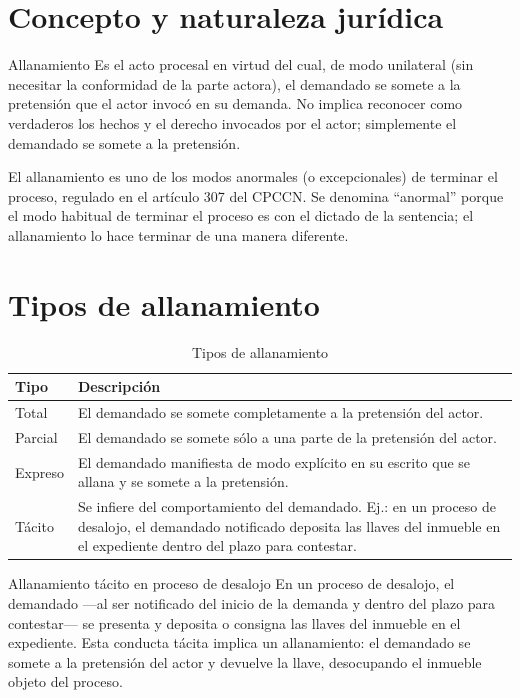 \documentclass[12pt,oneside]{book}
\begin{document}
\section{Concepto y naturaleza jurídica}

\begin{definition}{Allanamiento}
Es el acto procesal en virtud del cual, de modo unilateral (sin necesitar la conformidad de la parte actora), el demandado se somete a la pretensión que el actor invocó en su demanda. No implica reconocer como verdaderos los hechos y el derecho invocados por el actor; simplemente el demandado se somete a la pretensión.
\end{definition}

El allanamiento es uno de los modos anormales (o excepcionales) de terminar el proceso, regulado en el artículo 307 del CPCCN. Se denomina ``anormal'' porque el modo habitual de terminar el proceso es con el dictado de la sentencia; el allanamiento lo hace terminar de una manera diferente.

\section{Tipos de allanamiento}

\begin{table}[H]
\centering
\caption{Tipos de allanamiento}
\begin{tabularx}{\textwidth}{p{} X}
\toprule
\textbf{Tipo} & \textbf{Descripción} \\
\midrule
Total & El demandado se somete completamente a la pretensión del actor. \\
Parcial & El demandado se somete sólo a una parte de la pretensión del actor. \\
Expreso & El demandado manifiesta de modo explícito en su escrito que se allana y se somete a la pretensión. \\
Tácito & Se infiere del comportamiento del demandado. Ej.: en un proceso de desalojo, el demandado notificado deposita las llaves del inmueble en el expediente dentro del plazo para contestar. \\
\bottomrule
\end{tabularx}
\end{table}

\begin{example}{Allanamiento tácito en proceso de desalojo}
En un proceso de desalojo, el demandado —al ser notificado del inicio de la demanda y dentro del plazo para contestar— se presenta y deposita o consigna las llaves del inmueble en el expediente. Esta conducta tácita implica un allanamiento: el demandado se somete a la pretensión del actor y devuelve la llave, desocupando el inmueble objeto del proceso.
\end{example}
\end{document}
